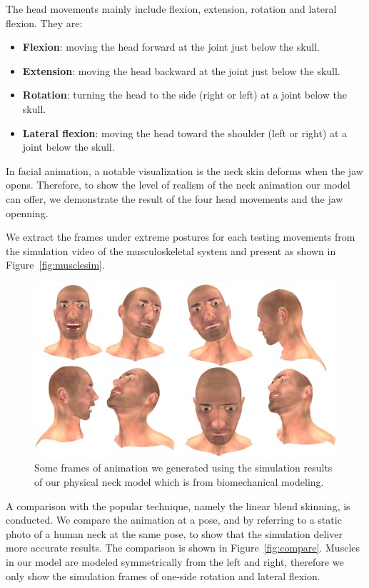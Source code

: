 The head movements mainly include flexion, extension, rotation and lateral flexion. They are:
\begin{itemize}
\item \textbf{Flexion}: moving the head forward at the joint just below the skull.
\item \textbf{Extension}: moving the head backward at the joint just below the skull.
\item \textbf{Rotation}: turning the head to the side (right or left) at a joint below the skull.
\item \textbf{Lateral flexion}: moving the head toward the shoulder (left or right) at a joint below the skull.
\end{itemize}
In facial animation, a notable visualization is the neck skin deforms when the jaw opens. Therefore, to show the level of realism of the neck animation our model can offer, we demonstrate the result of the four head movements and the jaw openning.

We extract the frames under extreme postures for each testing movements from the simulation video of the musculoskeletal system and present as shown in Figure~\ref{fig:musclesim}.
\begin{figure}
\begin{center}
\includegraphics[width=\textwidth]{vriphys/final}
\caption{Some frames of animation we generated using the simulation results of our physical neck model which is from biomechanical modeling.}
\label{fig:final}
\end{center}
\end{figure}

A comparison with the popular technique, namely the linear blend skinning, is conducted. We compare the animation at a pose, and by referring to a static photo of a human neck at the same pose, to show that the simulation deliver more accurate results. The comparison is shown in Figure~\ref{fig:compare}. Muscles in our model are modeled symmetrically from the left and right, therefore we only show the simulation frames of one-side rotation and lateral flexion.

